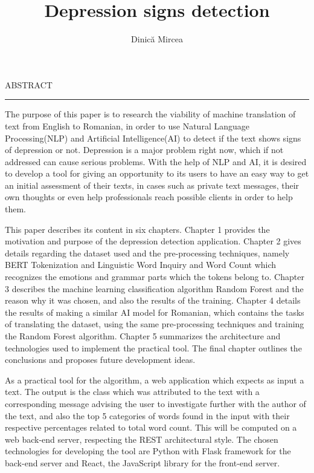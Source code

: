 \documentclass[12pt]{report}
\begin{document}
\title{Depression signs detection}					   
\author{Dinică Mircea}											
				
\maketitle


\newpage
\thispagestyle{empty}
\mbox{}
\newpage
{} 

\cleardoublepage
ABSTRACT
\vspace{0.5cm}	
\hrule
\vspace{0.5cm}	

The purpose of this paper is to research the viability of machine translation of text from English to Romanian, in order to use Natural Language Processing(NLP) and Artificial Intelligence(AI) to detect if the text shows signs of depression or not. Depression is a major problem right now, which if not addressed can cause serious problems. With the help of NLP and AI, it is desired to develop a tool for giving an opportunity to its users to have an easy way to get an initial assessment of their texts, in cases such as private text messages, their own thoughts or even help professionals reach possible clients in order to help them.

This paper describes its content in six chapters. Chapter 1 provides the motivation and purpose of the depression detection application. Chapter 2 gives details regarding the dataset used and the pre-processing techniques, namely BERT Tokenization and Linguistic Word Inquiry and Word Count which recognizes the emotions and grammar parts which the tokens belong to. Chapter 3 describes the machine learning classification algorithm Random Forest and the reason why it was chosen, and also the results of the training. Chapter 4 details the results of making a similar AI model for Romanian, which contains the tasks of translating the dataset, using the same pre-processing techniques and training the Random Forest algorithm.
Chapter 5 summarizes the architecture and technologies used to implement the practical tool. The final chapter outlines the conclusions and proposes future development ideas. 

As a practical tool for the algorithm, a web application which expects as input a text. The output is the class which was attributed to the text with a corresponding message advising the user to investigate further with the author of the text, and also the top 5 categories of words found in the input with their respective percentages related to total word count. This will be computed on a web back-end server, respecting the REST architectural style. The chosen technologies for developing the tool are Python with Flask framework for the back-end server and React, the JavaScript library for the front-end server.
\end{document}
